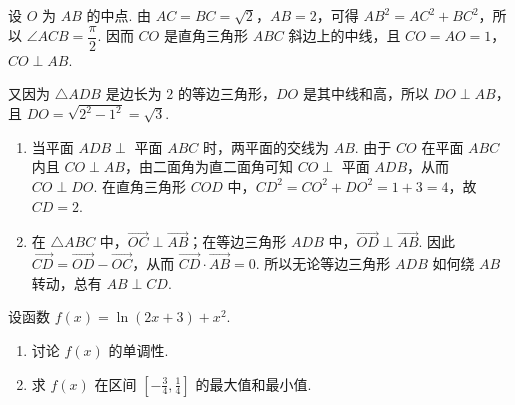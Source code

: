 \begin{solution}
设 \(O\) 为 \(AB\) 的中点. 由 \(AC=BC=\sqrt{2}\)，\(AB=2\)，可得 \(AB^{2}=AC^{2}+BC^{2}\)，所以 \(\angle ACB=\dfrac{\pi}{2}\). 因而 \(CO\) 是直角三角形 \(ABC\) 斜边上的中线，且 \(CO=AO=1\)，\(CO\perp AB\).

又因为 \(\triangle ADB\) 是边长为 \(2\) 的等边三角形，\(DO\) 是其中线和高，所以 \(DO\perp AB\)，且 \(DO=\sqrt{2^{2}-1^{2}}=\sqrt{3}\).

\begin{enumerate}
\item 当平面 \(ADB\perp\) 平面 \(ABC\) 时，两平面的交线为 \(AB\). 由于 \(CO\) 在平面 \(ABC\) 内且 \(CO\perp AB\)，由二面角为直二面角可知 \(CO\perp\) 平面 \(ADB\)，从而 \(CO\perp DO\). 在直角三角形 \(COD\) 中，\(CD^{2}=CO^{2}+DO^{2}=1+3=4\)，故 \(CD=2\).
\item 在 \(\triangle ABC\) 中，\(\overrightarrow{OC}\perp\overrightarrow{AB}\)；在等边三角形 \(ADB\) 中，\(\overrightarrow{OD}\perp\overrightarrow{AB}\). 因此
\(\overrightarrow{CD}=\overrightarrow{OD}-\overrightarrow{OC}\)，从而 \(\overrightarrow{CD}\cdot\overrightarrow{AB}=0\). 所以无论等边三角形 \(ADB\) 如何绕 \(AB\) 转动，总有 \(AB\perp CD\).
\end{enumerate}
\end{solution}

\begin{problem}
设函数 \( f(x) = \ln (2x + 3) + x^2 \).
\begin{enumerate}
\item 讨论 \( f(x) \) 的单调性.
\item 求 \( f(x) \) 在区间 \( \left[-\frac{3}{4}, \frac{1}{4}\right] \) 的最大值和最小值.
\end{enumerate}
\end{problem}


